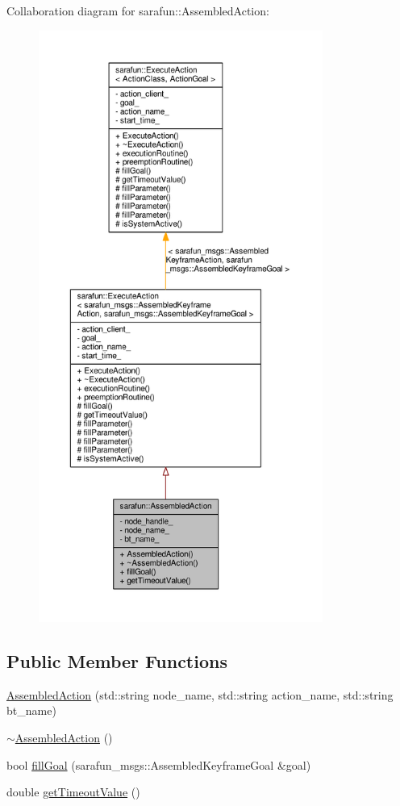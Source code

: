 Collaboration diagram for sarafun\-:\-:Assembled\-Action\-:
\nopagebreak
\begin{figure}[H]
\begin{center}
\leavevmode
\includegraphics[height=550pt]{d7/df2/classsarafun_1_1AssembledAction__coll__graph}
\end{center}
\end{figure}
\subsection*{Public Member Functions}
\begin{DoxyCompactItemize}
\item 
\hyperlink{classsarafun_1_1AssembledAction_a0207a1b903e0189627087d7ed71bc130_a0207a1b903e0189627087d7ed71bc130}{Assembled\-Action} (std\-::string node\-\_\-name, std\-::string action\-\_\-name, std\-::string bt\-\_\-name)
\item 
\hyperlink{classsarafun_1_1AssembledAction_a8d290f1548b55bca1995df599272fc2f_a8d290f1548b55bca1995df599272fc2f}{$\sim$\-Assembled\-Action} ()
\item 
bool \hyperlink{classsarafun_1_1AssembledAction_a094a5cfde4d6bb6d024256834e771a39_a094a5cfde4d6bb6d024256834e771a39}{fill\-Goal} (sarafun\-\_\-msgs\-::\-Assembled\-Keyframe\-Goal \&goal)
\item 
double \hyperlink{classsarafun_1_1AssembledAction_ade9095a291dce652339238d137419b49_ade9095a291dce652339238d137419b49}{get\-Timeout\-Value} ()
\end{DoxyCompactItemize}
